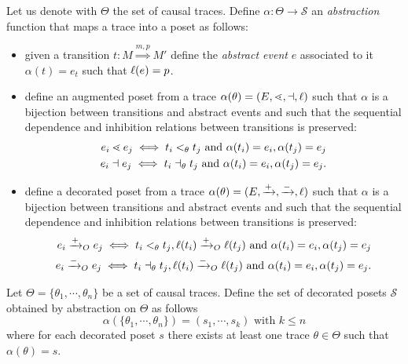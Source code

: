 \begin{definition}
  \label{def:abstraction}
  Let us denote with $\Theta$ the set of causal traces.
  Define $\alpha:\Theta\to\mathcal{S}$ an \emph{abstraction} function that maps a trace into a poset as follows:
    \begin{itemize}
    \item given a transition $t:M\overset{m,p}{\Rightarrow} M'$ define the \emph{abstract event} $e$ associated to it
      $\alpha(t) = e_t$ such that $\ell(e) = p$.
    \item define an augmented poset from a trace $\alpha(\theta) = (E,\lessdot,\dashv,\ell)$ such that $\alpha$ is a bijection between transitions and abstract events and such that the sequential dependence and inhibition relations between transitions is preserved:
      \begin{align*}
        e_i \lessdot e_j \iff t_i <_{\theta} t_j \text{ and } \alpha(t_i)=e_i, \alpha(t_j)=e_j\\
        e_i \dashv e_j \iff t_i \dashv_{\theta} t_j \text{ and } \alpha(t_i)=e_i, \alpha(t_j)=e_j.
      \end{align*}
    \item define a decorated poset from a trace $\alpha(\theta) = (E,\mathrel{\xrightarrow{+}},\mathrel{\xrightarrow{-}},\ell)$ such that $\alpha$ is a bijection between transitions and abstract events and such that the sequential dependence and inhibition relations between transitions is preserved:
      \begin{align*}
        e_i \mathrel{\xrightarrow{+}}_O e_j \iff t_i <_{\theta} t_j, \ell(t_i) \mathrel{\xrightarrow{+}}_O \ell(t_j)
        \text{ and } \alpha(t_i)=e_i, \alpha(t_j)=e_j\\
        e_i \mathrel{\xrightarrow{-}}_O e_j \iff t_i \dashv_{\theta} t_j, \ell(t_i) \mathrel{\xrightarrow{-}}_O \ell(t_j)
        \text{ and } \alpha(t_i)=e_i, \alpha(t_j)=e_j.
      \end{align*}
    \end{itemize}
    Let $\Theta = \{\theta_1,\cdots,\theta_n\}$ be a set of causal traces.
    Define the set of decorated posets $\mathcal{S}$ obtained by abstraction on $\Theta$ as follows
    \[
    \alpha(\{\theta_1,\cdots,\theta_n\}) = (s_1,\cdots, s_k)\text{ with }k\leq n
    \]
    where for each decorated poset $s$ there exists at least one trace $\theta\in\Theta$ such that $\alpha(\theta) = s$.
\end{definition}

